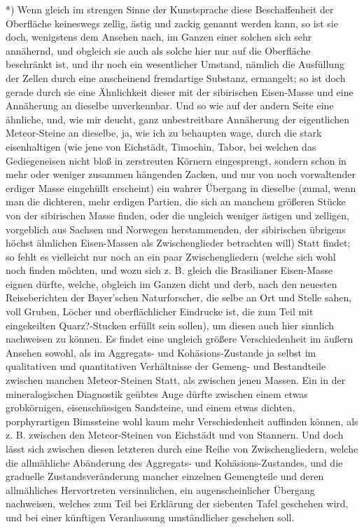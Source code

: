 \documentclass[a4paper, 11pt, oneside, german]{article}
\begin{document}
*) Wenn gleich im strengen Sinne der Kunstsprache diese Beschaffenheit der Oberfläche keineswegs zellig, ästig und zackig genannt werden kann, so ist sie doch, wenigstens dem Ansehen nach, im Ganzen einer solchen sich sehr annähernd, und obgleich sie auch als solche hier nur auf die Oberfläche beschränkt ist, und ihr noch ein wesentlicher Umstand, nämlich die Ausfüllung der Zellen durch eine anscheinend fremdartige Substanz, ermangelt; so ist doch gerade durch sie eine Ähnlichkeit dieser mit der sibirischen Eisen-Masse und eine Annäherung an dieselbe unverkennbar. Und so wie auf der andern Seite eine ähnliche, und, wie mir deucht, ganz unbestreitbare Annäherung der eigentlichen Meteor-Steine an dieselbe, ja, wie ich zu behaupten wage, durch die stark eisenhaltigen (wie jene von Eichstädt, Timochin, Tabor, bei welchen das Gediegeneisen nicht bloß in zerstreuten Körnern eingesprengt, sondern schon in mehr oder weniger zusammen hängenden Zacken, und nur von noch vorwaltender erdiger Masse eingehüllt erscheint) ein wahrer Übergang in dieselbe (zumal, wenn man die dichteren, mehr erdigen Partien, die sich an manchem größeren Stücke von der sibirischen Masse finden, oder die ungleich weniger ästigen und zelligen, vorgeblich aus Sachsen und Norwegen herstammenden, der sibirischen übrigens höchst ähnlichen Eisen-Massen als Zwischenglieder betrachten will) Statt findet; so fehlt es vielleicht nur noch an ein paar Zwischengliedern (welche sich wohl noch finden möchten, und wozu sich z. B. gleich die Brasilianer Eisen-Masse eignen dürfte, welche, obgleich im Ganzen dicht und derb, nach den neuesten Reiseberichten der Bayer'schen Naturforscher, die selbe an Ort und Stelle sahen, voll Gruben, Löcher und oberflächlicher Eindrucke ist, die zum Teil mit eingekeilten Quarz?-Stucken erfüllt sein sollen), um diesen auch hier sinnlich nachweisen zu können. Es findet eine ungleich größere Verschiedenheit im äußern Ansehen sowohl, als im Aggregats- und Kohäsions-Zustande ja selbst im qualitativen und quantitativen Verhältnisse der Gemeng- und Bestandteile zwischen manchen Meteor-Steinen Statt, als zwischen jenen Massen. Ein in der mineralogischen Diagnostik geübtes Auge dürfte zwischen einem etwas grobkörnigen, eisenschüssigen Sandsteine, und einem etwas dichten, porphyrartigen Bimssteine wohl kaum mehr Verschiedenheit auffinden können, als z. B. zwischen den Meteor-Steinen von Eichstädt und von Stannern. Und doch lässt sich zwischen diesen letzteren durch eine Reihe von Zwischengliedern, welche die allmähliche Abänderung des Aggregats- und Kohäsions-Zustandes, und die graduelle Zustandsveränderung mancher einzelnen Gemengteile und deren allmähliches Hervortreten versinnlichen, ein augenscheinlicher Übergang nachweisen, welches zum Teil bei Erklärung der siebenten Tafel geschehen wird, und bei einer künftigen Veranlassung umständlicher geschehen soll.  
\end{document}
